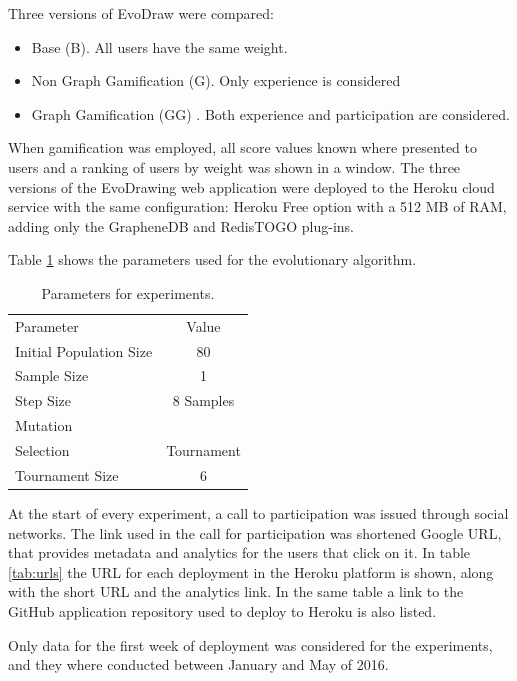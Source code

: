 Three versions of EvoDraw were compared:
\begin{itemize}
\item Base (B). All users have the same weight.
\item Non Graph Gamification (G). Only experience is considered
\item Graph Gamification (GG) . Both experience and participation are considered.
\end{itemize}
When gamification was employed, all score values known where presented to users
and a ranking of users by weight was shown in a window.
The three versions of the EvoDrawing web application were deployed to the
Heroku cloud service with the same configuration: Heroku Free option with a 512 MB of RAM, adding only the GrapheneDB and RedisTOGO plug-ins.

Table \ref{tab:params} shows the parameters used for the evolutionary algorithm. 

\begin{table}
  \small
  \caption{ Parameters for experiments.  }
  \label{tab:params} 
  \centering
  \small
  \begin{tabular}{l  c   }
    \hline\noalign{\smallskip}
     Parameter & Value \\
    \noalign{\smallskip}\hline\noalign{\smallskip}
    Initial Population Size   & 80 \\ \hline
    Sample Size & 1 \\ \hline
    Step Size & 8 Samples \\ \hline
    Mutation &  \\ \hline
    Selection & Tournament \\ \hline
    Tournament Size &  6 \\ \hline
  \end{tabular}
\end{table}

At the start of every experiment, a call to participation was issued
through social networks.  The link used in the call for participation
was shortened Google URL, that provides metadata and analytics for the
users that click on it.  In table \ref{tab:urls} the URL for each 
deployment in the Heroku platform is shown,
along with the short URL and the analytics link. In the same table a link to the GitHub 
application repository used to deploy to Heroku is also listed.    

Only data for the first week of deployment was considered 
for the experiments, and they where conducted 
between January and May of 2016. 

